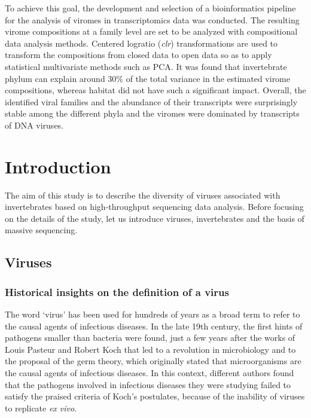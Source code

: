 \documentclass[
  openany]{book}
\begin{document}
To achieve this goal, the development and selection of a bioinformatics pipeline for the analysis of viromes in transcriptomics data was conducted. The resulting virome compositions at a family level are set to be analyzed with compositional data analysis methods. Centered logratio (\emph{clr}) transformations are used to transform the compositions from closed data to open data so as to apply statistical multivariate methods such as PCA. It was found that invertebrate phylum can explain around \(30\%\) of the total variance in the estimated virome compositions, whereas habitat did not have such a significant impact. Overall, the identified viral families and the abundance of their transcripts were surprisingly stable among the different phyla and the viromes were dominated by transcripts of DNA viruses.

\hypertarget{introduction}{%
\chapter{Introduction}\label{introduction}}

The aim of this study is to describe the diversity of viruses associated with invertebrates based on high-throughput sequencing data analysis. Before focusing on the details of the study, let us introduce viruses, invertebrates and the basis of massive sequencing.

\hypertarget{viruses}{%
\section{Viruses}\label{viruses}}

\hypertarget{historical-insights-on-the-definition-of-a-virus}{%
\subsection{Historical insights on the definition of a virus}\label{historical-insights-on-the-definition-of-a-virus}}

The word `virus' has been used for hundreds of years as a broad term to refer to the causal agents of infectious diseases. In the late 19th century, the first hints of pathogens smaller than bacteria were found, just a few years after the works of Louis Pasteur and Robert Koch that led to a revolution in microbiology and to the proposal of the germ theory, which originally stated that microorganisms are the causal agents of infectious diseases. In this context, different authors found that the pathogens involved in infectious diseases they were studying failed to satisfy the praised criteria of Koch's postulates, because of the inability of viruses to replicate \emph{ex vivo}.
\end{document}
